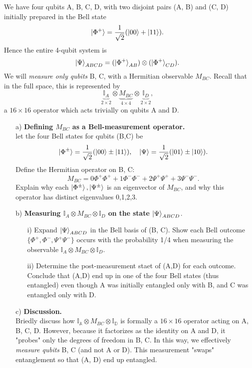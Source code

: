 \documentclass{article}
\begin{document}
\begin{question}
    We have four qubits A, B, C, D, with two disjoint pairs (A, B) and (C, D) initially prepared in the Bell state $$\ket{\Phi^+}=\frac{1}{\sqrt{2}}(\ket{00}+\ket{11}).$$ Hence the entire 4-qubit system is $$\ket{\Psi}_{ABCD}=(\ket{\Phi^+}_{AB})\otimes(\ket{\Phi^+}_{CD}).$$ We will \textit{measure only qubits} B, C, with a Hermitian observable $M_{BC}$. Recall that in the full space, this is represented by $$\underbrace{\mathbb{I}_A}_{2\times 2} \otimes \underbrace{M_{BC}}_{4\times 4} \otimes \underbrace{\mathbb{I}_D}_{2\times 2},$$ a $16\times 16$ operator which acts trivially on qubits A and D.
    \begin{enumerate}
        \item[a)]\textbf{Defining $M_{BC}$ as a Bell-measurement operator.}\\
        let the four Bell states for qubits (B,C) be $$\ket{\Phi^\pm}=\frac{1}{\sqrt{2}}(\ket{00}\pm\ket{11}), \quad \ket{\Psi}=\frac{1}{\sqrt{2}}(\ket{01}\pm\ket{10}).$$ Define the Hermitian operator on B, C: $$M_{BC}=0\Phi^+\Phi^++1\Phi^-\Phi^-+2\Psi^+\Psi^++3\Psi^-\Psi^-.$$ Explain why each $\ket{\Phi^\pm},\ket{\Psi^\pm}$ is an eigenvector of $M_{BC}$, and why this operator has distinct eigenvalues 0,1,2,3.
        \item[b)]\textbf{Measuring $\mathbb{I}_A \otimes M_{BC} \otimes \mathbb{I}_D$ on the state $\ket{\Psi}_{ABCD}$}.
        \begin{enumerate}
            \item[i)] Expand $\ket{\Psi}_{ABCD}$ in the Bell basis of (B, C). Show each Bell outcome $\{\Phi^+,\Phi^-,\Psi^+\Psi^-\}$ occurs with the probability 1/4 when measuring the observable $\mathbb{I}_A \otimes M_{BC} \otimes \mathbb{I}_D$.
            \item[ii)] Determine the post-measurement staet of (A,D) for each outcome. Conclude that (A,D) end up in one of the four Bell states (thus entangled) even though A was initially entangled only with B, and C was entangled only with D.
        \end{enumerate}
        \item[c)]\textbf{Discussion.}\\
        Briedly discuss how $\mathbb{I_A}\otimes M_{BC} \otimes \mathbb{I_D}$ is formally a $16\times16$ operator acting on A, B, C, D. However, because it factorizes as the identity on A and D, it "probes" only the degrees of freedom in B, C. In this way, we effectively \textit{measure qubits} B, C (and not A or D). This measurement "swaps" entanglement so that (A, D) end up entangled.
    \end{enumerate}
\end{question}
\end{document}
